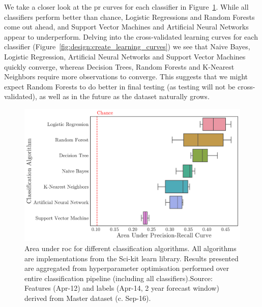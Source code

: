 \documentclass[../thesis/thesis.tex]{subfiles}
\begin{document}
We take a closer look at the \gls{pr} curves for each classifier in Figure~\ref{fig:design:classifier}. While all classifiers perform better than chance, Logistic Regressions and Random Forests come out ahead, and Support Vector Machines and Artificial Neural Networks appear to underperform. Delving into the cross-validated learning curves for each classifier (Figure~\ref{fig:design:create_learning_curves}) we see that Naive Bayes, Logistic Regression, Artificial Neural Networks and Support Vector Machines quickly converge, whereas Decision Trees, Random Forests and K-Nearest Neighbors require more observations to converge. This suggests that we might expect Random Forests to do better in final testing (as testing will not be cross-validated), as well as in the future as the dataset naturally grows.

\begin{figure}[!htb]
    \centering
    \includegraphics[width=\textwidth]{../figures/design/classifier}
    \caption[Area under PR Curves by classification algorithms]{Area under \gls{roc} for different classification algorithms. All algorithms are implementations from the Sci-kit learn library. Results presented are aggregated from hyperparameter optimisation performed over entire classification pipeline (including all classifiers).Source: Features (Apr-12) and labels (Apr-14, 2 year forecast window) derived from Master dataset (c. Sep-16).}
    \label{fig:design:classifier}
\end{figure}
\end{document}
